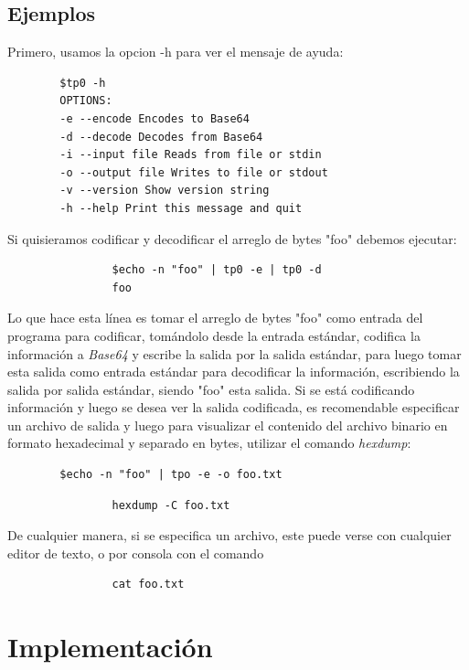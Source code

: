\documentclass[a4paper,10pt, fleqn]{article}
\begin{document}
	\subsection{Ejemplos}
	     Primero, usamos la opcion -h para ver el mensaje de ayuda:
	     \begin{verbatim}
		$tp0 -h
		OPTIONS:
		-e --encode Encodes to Base64
		-d --decode Decodes from Base64
		-i --input file Reads from file or stdin
		-o --output file Writes to file or stdout
		-v --version Show version string
		-h --help Print this message and quit

 	     \end{verbatim}
	     
	     Si quisieramos codificar y decodificar el arreglo de bytes "foo" debemos ejecutar:
             \begin{verbatim}
                $echo -n "foo" | tp0 -e | tp0 -d
				foo
             \end{verbatim}
			 Lo que hace esta línea es tomar el arreglo de bytes "foo" como entrada del programa para codificar, tomándolo desde la entrada estándar,
			 codifica la información a \emph{Base64} y escribe la salida por la salida estándar, para luego tomar esta salida 
			 como entrada estándar para decodificar la información, escribiendo la salida por salida estándar, siendo "foo" esta salida.
	    Si se está codificando información y luego se desea ver la salida codificada, es recomendable especificar un archivo de salida y luego para visualizar el contenido del archivo binario en formato hexadecimal y separado en bytes, utilizar el comando \emph{hexdump}:
		\begin{verbatim}
		$echo -n "foo" | tpo -e -o foo.txt
		\end{verbatim}	    

             \begin{verbatim}
                hexdump -C foo.txt
             \end{verbatim}
	      De cualquier manera, si se especifica un archivo, este puede verse con cualquier editor 
	      de texto, o por consola con el comando
             \begin{verbatim}
                cat foo.txt
             \end{verbatim}
 

\section{Implementación}
\end{document}
